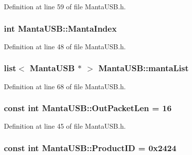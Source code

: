 \-Definition at line 59 of file \-Manta\-U\-S\-B.\-h.

\hypertarget{classMantaUSB_a689a16560bfa8ecd1681e2f0397f68f2}{
\subsubsection[{\-Manta\-Index}]{\setlength{\rightskip}{0pt plus 5cm}int {\bf \-Manta\-U\-S\-B\-::\-Manta\-Index}}}\label{classMantaUSB_a689a16560bfa8ecd1681e2f0397f68f2}


\-Definition at line 48 of file \-Manta\-U\-S\-B.\-h.

\hypertarget{classMantaUSB_a6c2c001a6d17abfd0f6ab6a6d36ce288}{
\subsubsection[{manta\-List}]{\setlength{\rightskip}{0pt plus 5cm}list$<$ {\bf \-Manta\-U\-S\-B} $\ast$ $>$ {\bf \-Manta\-U\-S\-B\-::manta\-List}}}\label{classMantaUSB_a6c2c001a6d17abfd0f6ab6a6d36ce288}


\-Definition at line 68 of file \-Manta\-U\-S\-B.\-h.

\hypertarget{classMantaUSB_a32fd2c8f871a3639bf913f599c2f3b04}{
\subsubsection[{\-Out\-Packet\-Len}]{\setlength{\rightskip}{0pt plus 5cm}const int {\bf \-Manta\-U\-S\-B\-::\-Out\-Packet\-Len} = 16}}\label{classMantaUSB_a32fd2c8f871a3639bf913f599c2f3b04}


\-Definition at line 45 of file \-Manta\-U\-S\-B.\-h.

\hypertarget{classMantaUSB_aa78f9ab72991bc6ed711e6b823e98a00}{
\subsubsection[{\-Product\-I\-D}]{\setlength{\rightskip}{0pt plus 5cm}const int {\bf \-Manta\-U\-S\-B\-::\-Product\-I\-D} = 0x2424}}\label{classMantaUSB_aa78f9ab72991bc6ed711e6b823e98a00}


